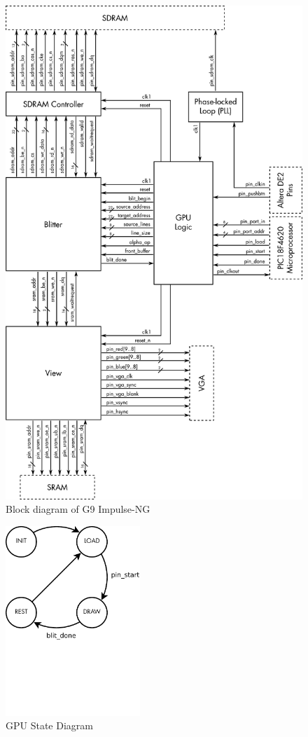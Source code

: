 \documentclass{report}
\begin{document}
\begin{figure}
    \begin{center}
        \vspace{-0.875in}
        \includegraphics[width=4.5in]{gpu-inside}
    \end{center}
    \caption{Block diagram of G9 Impulse-NG}
    \label{fig:block_diagram}
\end{figure}

\begin{figure}
    \begin{center}
        \includegraphics[width=2in,trim=0 2.3in 0 0,clip=true]{gpu_state}
    \end{center}
    \caption{GPU State Diagram}
    \label{fig:gpu_state_diagram}
\end{figure}
\end{document}
